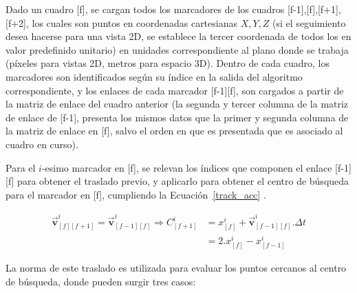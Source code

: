 Dado un cuadro [f], se cargan todos los marcadores de los cuadros [f-1],[f],[f+1],[f+2], los cuales son puntos en coordenadas cartesianas $X,Y,Z$ (si el seguimiento desea hacerse para una vista 2D, se establece la tercer coordenada de todos los en valor predefinido unitario) en unidades correspondiente al plano donde se trabaja (píxeles para vistas 2D, metros para espacio 3D). Dentro de cada cuadro, los marcadores son identificados según su índice en la salida del algoritmo correspondiente, y los enlaces de cada marcador [f-1][f], son cargados a partir de la matriz de enlace del cuadro anterior (la segunda y tercer columna de la matriz de enlace de [f-1], presenta los mismos datos que la primer y segunda columna de la matriz de enlace en [f], salvo el orden en que es presentada que es asociado al cuadro en curso).

Para el $i$-esimo marcador en [f], se relevan los índices que componen el enlace [f-1][f] para obtener el traslado previo, y aplicarlo para obtener el centro de búsqueda para el marcador en [f], cumpliendo la Ecuación~\ref{track_acc} .

\begin{equation}
\begin{split}
\boldsymbol{\overrightarrow{v}}_{[f][f+1]}^{i} = \boldsymbol{\overrightarrow{v}}_{[f-1][f]}^{i} \Rightarrow C_{[f+1]}^{i} &= x_{[f]}^{i} + \boldsymbol{\overrightarrow{v}}_{[f-1][f]}^{i}.\Delta{t} \\
&= 2.x_{[f]}^{i} -x_{[f-1]}^{i} 
\end{split}
\label{centro_busqueda_f1}
\end{equation}

La norma de este traslado es utilizada para evaluar los puntos cercanos al centro de búsqueda, donde pueden surgir tres casos:

